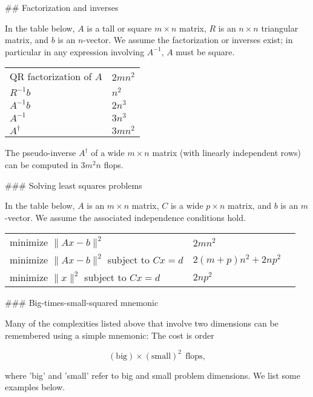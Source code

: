 

## Factorization and inverses

In the table below, \(A\) is a tall or square \(m\times n\) matrix, \(R\) is an \(n\times n\) triangular matrix, and \(b\) is an \(n\)-vector. We assume the factorization or inverses exist; in particular in any expression involving \(A^{-1}\), \(A\) must be square.

\begin{tabular}{l l} QR factorization of \(A\) & \(2mn^{2}\) \\ \(R^{-1}b\) & \(n^{2}\) \\ \(A^{-1}b\) & \(2n^{3}\) \\ \(A^{-1}\) & \(3n^{3}\) \\ \(A^{\dagger}\) & \(3mn^{2}\) \\ \end{tabular} The pseudo-inverse \(A^{\dagger}\) of a wide \(m\times n\) matrix (with linearly independent rows) can be computed in \(3m^{2}n\) flops.

### Solving least squares problems

In the table below, \(A\) is an \(m\times n\) matrix, \(C\) is a wide \(p\times n\) matrix, and \(b\) is an \(m\)-vector. We assume the associated independence conditions hold.

\begin{tabular}{l l l} minimize \(\|Ax-b\|^{2}\) & \(2mn^{2}\) \\ minimize \(\|Ax-b\|^{2}\) subject to \(Cx=d\) & \(2(m+p)n^{2}+2np^{2}\) \\ minimize \(\|x\|^{2}\) subject to \(Cx=d\) & \(2np^{2}\) \\ \end{tabular}

### Big-times-small-squared mnemonic

Many of the complexities listed above that involve two dimensions can be remembered using a simple mnemonic: The cost is order

\[(\text{big})\times(\text{small})^{2}\ \ \text{flops},\]

where 'big' and 'small' refer to big and small problem dimensions. We list some examples below.

